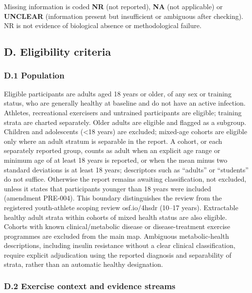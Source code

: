 \documentclass[
  11pt,
  a4paper,
]{article}
\begin{document}
Missing information is coded \textbf{NR} (not reported), \textbf{NA}
(not applicable) or \textbf{UNCLEAR} (information present but
insufficient or ambiguous after checking). NR is not evidence of
biological absence or methodological failure.

\subsection{D. Eligibility criteria}\label{d.-eligibility-criteria}

\subsubsection{D.1 Population}\label{d.1-population}

Eligible participants are adults aged 18 years or older, of any sex or
training status, who are generally healthy at baseline and do not have
an active infection. Athletes, recreational exercisers and untrained
participants are eligible; training strata are charted separately. Older
adults are eligible and flagged as a subgroup. Children and adolescents
(\textless18 years) are excluded; mixed-age cohorts are eligible only
where an adult stratum is separable in the report. A cohort, or each
separately reported group, counts as adult when an explicit age range or
minimum age of at least 18 years is reported, or when the mean minus two
standard deviations is at least 18 years; descriptors such as ``adults''
or ``students'' do not suffice. Otherwise the report remains awaiting
classification, not excluded, unless it states that participants younger
than 18 years were included (amendment PRE-004). This boundary
distinguishes the review from the registered youth-athlete scoping
review osf.io/4hsdr (10--17 years). Extractable healthy adult strata
within cohorts of mixed health status are also eligible. Cohorts with
known clinical/metabolic disease or disease-treatment exercise
programmes are excluded from the main map. Ambiguous metabolic-health
descriptions, including insulin resistance without a clear clinical
classification, require explicit adjudication using the reported
diagnosis and separability of strata, rather than an automatic healthy
designation.

\subsubsection{D.2 Exercise context and evidence
streams}\label{d.2-exercise-context-and-evidence-streams}
\end{document}
